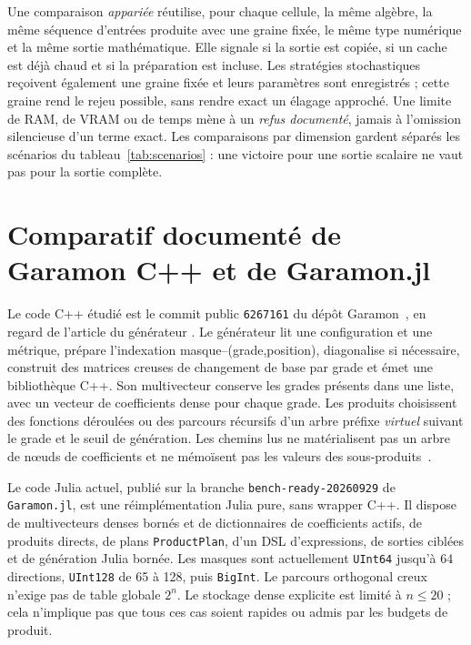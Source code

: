 \documentclass[11pt,a4paper]{article}
\newcommand{\code}[1]{\texttt{#1}}
\begin{document}
Une comparaison \emph{appariée} réutilise, pour chaque cellule, la même
algèbre, la même séquence d'entrées produite avec une graine fixée, le
même type numérique et la même sortie mathématique. Elle signale si la
sortie est copiée, si un cache est déjà chaud et si la préparation est
incluse. Les stratégies stochastiques reçoivent également une graine
fixée et leurs paramètres sont enregistrés ; cette graine rend le rejeu
possible, sans rendre exact un élagage approché. Une limite de RAM, de
VRAM ou de temps mène à un \emph{refus documenté}, jamais à l'omission
silencieuse d'un terme exact. Les comparaisons par dimension gardent
séparés les scénarios du tableau~\ref{tab:scenarios} : une victoire pour
une sortie scalaire ne vaut pas pour la sortie complète.

\section{Comparatif documenté de Garamon C++ et de Garamon.jl}
Le code C++ étudié est le commit public \code{6267161} du dépôt
Garamon~\cite{garamoncpp}, en regard de l'article du générateur
\cite{breuils2019}. Le générateur lit une configuration et une métrique, prépare
l'indexation masque--(grade,position), diagonalise si nécessaire, construit
des matrices creuses de changement de base par grade et émet une bibliothèque
C++. Son multivecteur conserve les grades présents dans une liste, avec un
vecteur de coefficients dense pour chaque grade. Les produits choisissent des
fonctions déroulées ou des parcours récursifs d'un arbre préfixe \emph{virtuel}
suivant le grade et le seuil de génération. Les chemins lus ne matérialisent
pas un arbre de nœuds de coefficients et ne mémoïsent pas les valeurs des
sous-produits~\cite{cppmain,cppindex,cppdispatch,cppmvec,cppgeometric,cppmetric}.

Le code Julia actuel, publié sur la branche \code{bench-ready-20260929}
de \code{Garamon.jl}, est une
réimplémentation Julia pure, sans wrapper C++. Il dispose de multivecteurs
denses bornés et de dictionnaires de coefficients actifs, de produits directs,
de plans \code{ProductPlan}, d'un DSL d'expressions, de sorties ciblées et de
génération Julia bornée. Les masques sont actuellement \code{UInt64} jusqu'à
64 directions, \code{UInt128} de 65 à 128, puis \code{BigInt}. Le parcours
orthogonal creux n'exige pas de table globale $2^n$. Le stockage dense explicite
est limité à $n\leq20$ ; cela n'implique pas que tous ces cas soient rapides ou
admis par les budgets de produit.
\end{document}
